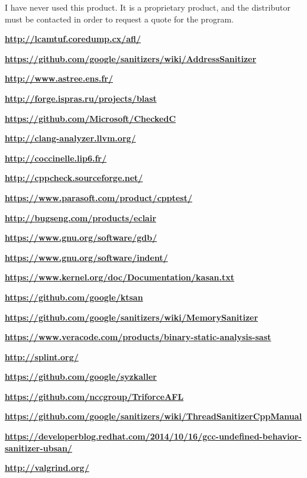 \documentclass[12pt]{article}
\let\myurl\url%
\renewcommand\url[1]{\textbf{\myurl{#1}}}
\begin{document}
I have never used this product. It is a proprietary product, and the
distributor must be contacted in order to request a quote for the program.
\cite{sast}
\newpage

\begin{thebibliography}{9}

    \url{http://lcamtuf.coredump.cx/afl/}

    \url{https://github.com/google/sanitizers/wiki/AddressSanitizer}

    \url{http://www.astree.ens.fr/}

    \url{http://forge.ispras.ru/projects/blast}

    \url{https://github.com/Microsoft/CheckedC}

    \url{http://clang-analyzer.llvm.org/}

    \url{http://coccinelle.lip6.fr/}

    \url{http://cppcheck.sourceforge.net/}

    \url{https://www.parasoft.com/product/cpptest/}

    \url{http://bugseng.com/products/eclair}

    \url{https://www.gnu.org/software/gdb/}

    \url{https://www.gnu.org/software/indent/}

    \url{https://www.kernel.org/doc/Documentation/kasan.txt}

    \url{https://github.com/google/ktsan}

    \url{https://github.com/google/sanitizers/wiki/MemorySanitizer}

    \url{https://www.veracode.com/products/binary-static-analysis-sast}

    \url{http://splint.org/}

    \url{https://github.com/google/syzkaller}

    \url{https://github.com/nccgroup/TriforceAFL}

    \url{https://github.com/google/sanitizers/wiki/ThreadSanitizerCppManual}

    \url{https://developerblog.redhat.com/2014/10/16/gcc-undefined-behavior-sanitizer-ubsan/}

    \url{http://valgrind.org/}


\end{thebibliography}
\end{document}
